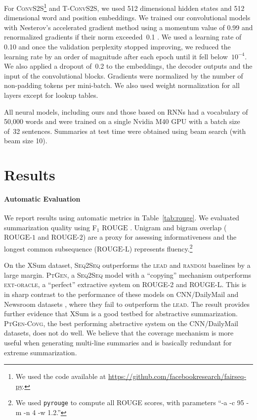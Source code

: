 For \textsc{ConvS2S}\footnote{We used the code available at
  \url{https://github.com/facebookresearch/fairseq-py}.} and
\textsc{T-ConvS2S}, we used 512 dimensional hidden states and 512
dimensional word and position embeddings. We trained our convolutional
models with Nesterov's accelerated gradient method
\cite{Sutskever:2013} using a momentum value of 0.99 and renormalized
gradients if their norm exceeded~0.1 \cite{Pascanu:2013}. We used a
learning rate of 0.10 and once the validation perplexity stopped
improving, we reduced the learning rate by an order of magnitude after
each epoch until it fell below~$10^{-4}$. We also applied a dropout
of~0.2 to the embeddings, the decoder outputs and the input of the
convolutional blocks. Gradients were normalized by the number of
non-padding tokens per mini-batch. We also used weight normalization
for all layers except for lookup tables.

All neural models, including ours and those based on RNNs \cite{see-acl17}
had a vocabulary of 50,000 words and were trained on a single Nvidia
M40 GPU with a batch size of~32 sentences.  Summaries at test time
were obtained using beam search (with beam size 10).

\section{Results}
\label{sec:results}


\paragraph{Automatic Evaluation} 

We report results using automatic metrics in Table~\ref{tab:rouge}.
We evaluated summarization quality using F$_1$ $\mbox{ROUGE}$
\cite{rouge}. Unigram and bigram overlap ($\mbox{ROUGE-1}$ and
$\mbox{ROUGE-2}$) are a proxy for assessing informativeness and the
longest common subsequence ($\mbox{ROUGE-L}$) represents
fluency.\footnote{We used \texttt{pyrouge} to compute all ROUGE
  scores, with parameters ``-a -c 95 -m -n 4 -w 1.2.''}



On the XSum dataset, \textsc{Seq2Seq} outperforms the \textsc{lead}
and \textsc{random} baselines by a large margin. \textsc{PtGen}, a
\textsc{Seq2Seq} model with a ``copying'' mechanism outperforms
\textsc{ext-oracle}, a ``perfect'' extractive system on ROUGE-2 and
ROUGE-L. This is in sharp contrast to the performance of these models
on CNN/DailyMail \cite{see-acl17} and  Newsroom datasets
\cite{newsroom-naacl18}, where they fail to outperform the
\textsc{lead}. The result provides further evidence that XSum is a
good testbed for abstractive summarization. \textsc{PtGen-Covg}, the
best performing abstractive system on the CNN/DailyMail datasets, does
not do well.  We believe that the coverage mechanism is more useful
when generating multi-line summaries and is basically redundant for
extreme summarization. 

